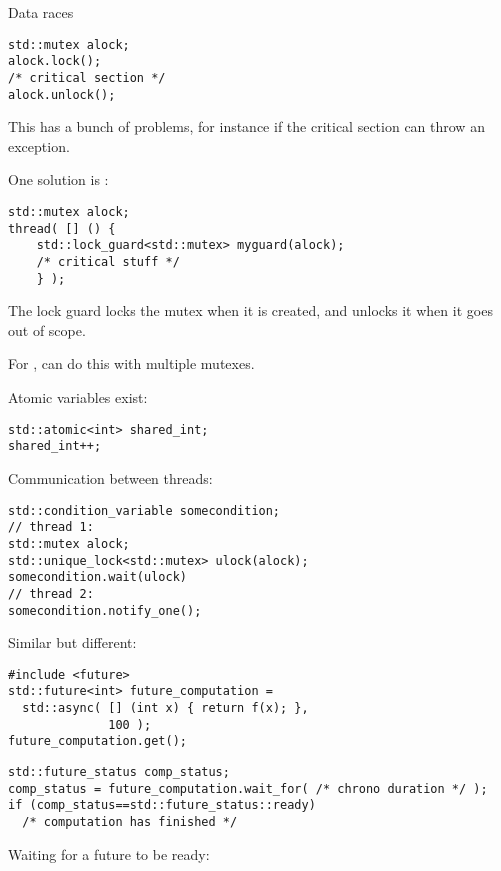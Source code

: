  {Data races}

\begin{lstlisting}
std::mutex alock;
alock.lock();
/* critical section */
alock.unlock();
\end{lstlisting}
This has a bunch of problems, for instance if the critical section can throw
an exception.

One solution is :
\begin{lstlisting}
std::mutex alock;
thread( [] () {
    std::lock_guard<std::mutex> myguard(alock);
    /* critical stuff */
    } );
\end{lstlisting}
The lock guard locks the mutex when it is created,
and unlocks it when it goes out of scope.

For , 
can do this with multiple mutexes.

Atomic variables exist:
\begin{lstlisting}
std::atomic<int> shared_int;
shared_int++;
\end{lstlisting}

Communication between threads:
\begin{lstlisting}
std::condition_variable somecondition;
// thread 1:
std::mutex alock;
std::unique_lock<std::mutex> ulock(alock);
somecondition.wait(ulock)
// thread 2:
somecondition.notify_one();
\end{lstlisting}

Similar but different:
\begin{lstlisting}
#include <future>
std::future<int> future_computation =
  std::async( [] (int x) { return f(x); },
              100 );
future_computation.get();
\end{lstlisting}

\begin{lstlisting}
std::future_status comp_status;
comp_status = future_computation.wait_for( /* chrono duration */ );
if (comp_status==std::future_status::ready)
  /* computation has finished */
\end{lstlisting}

Waiting for a future to be ready:
%

